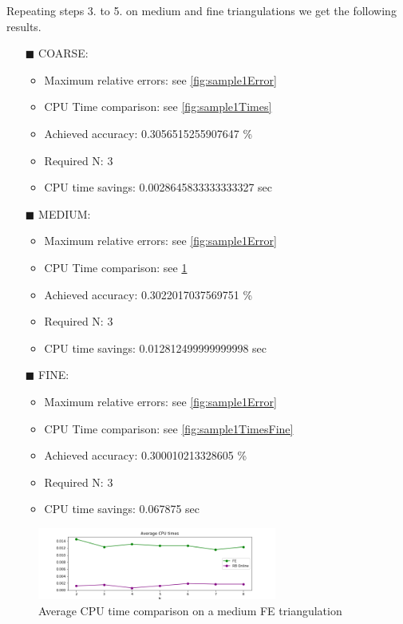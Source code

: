 \documentclass[
	english,
	11pt, %
]{fphw}
\begin{document}
Repeating steps 3. to 5. on medium and fine triangulations we get the following results.

\begin{itemize}
	\item[$\blacksquare$] COARSE: 
	\begin{itemize}
		\item Maximum relative errors: see \cref{fig:sample1Error} 
		\item CPU Time comparison: see \cref{fig:sample1Times}
		\item Achieved accuracy: 0.3056515255907647 \%
		\item Required N: 3
		\item CPU time savings: 0.0028645833333333327 sec
	\end{itemize}
	\item[$\blacksquare$] MEDIUM: 
	\begin{itemize}
		\item Maximum relative errors: see \cref{fig:sample1Error} 
		\item CPU Time comparison: see \cref{fig:sample1TimesMedium}
		\item Achieved accuracy: 0.3022017037569751 \%
		\item Required N: 3
		\item CPU time savings: 0.012812499999999998 sec
	\end{itemize}
	\item[$\blacksquare$] FINE: 
	\begin{itemize}
		\item Maximum relative errors: see \cref{fig:sample1Error} 
		\item CPU Time comparison: see \cref{fig:sample1TimesFine}
		\item Achieved accuracy: 0.300010213328605 \%
		\item Required N: 3
		\item CPU time savings: 0.067875 sec
	\end{itemize}
\end{itemize}

\begin{figure}[H]
	\centering
	\includegraphics[width=0.7\textwidth]{sample1TimeMedium.png}
	\caption{Average CPU time comparison on a medium FE triangulation}
	\label{fig:sample1TimesMedium}
\end{figure}
\end{document}
